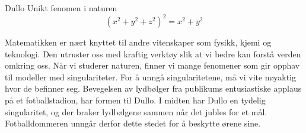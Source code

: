 \begin{surferPage}{Dullo}
Unikt fenomen i naturen\\
\smallskip
\[(x^2+ y^2+ z^2)^2	= x^2+ y^2\]

\singlespacing
Matematikken er nært knyttet til andre vitenskaper som fysikk, kjemi og teknologi. Den utruster oss med kraftig verktøy slik at vi bedre kan forstå verden omkring oss.  
\singlespacing
Når vi studerer naturen, finner vi mange fenomener som gir opphav til modeller med singulariteter. For å unngå singularitetene, må vi vite nøyaktig hvor de befinner seg.
\singlespacing
Bevegelsen av lydbølger fra publikums entusiastiske applaus på et fotballstadion, har formen til Dullo. I midten har Dullo en tydelig singularitet, og der braker lydbølgene sammen når det jubles for et mål. Fotballdommeren unngår derfor dette stedet for å beskytte ørene sine.
\end{surferPage}
